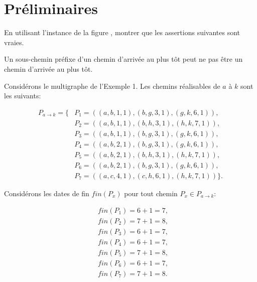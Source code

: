 
\section{Préliminaires}
\label{sec:preliminaires}

\begin{question}
  En utilisant l'instance de la figure , montrer que les assertions suivantes
  sont vraies.
\end{question}

\begin{assertion}
  Un sous-chemin préfixe d'un chemin d'arrivée au plus tôt peut ne pas
  être un chemin d'arrivée au plus tôt.
\end{assertion}


\begin{reponse}
  Considérons le multigraphe de l'Exemple 1. Les chemins réalisables de $a$ à
  $k$ sont les suivants:

  \begin{equation}
    \begin{align}
      \label{eq:1}
      P_{a \rightarrow k} = \{ & P_1 = ((a,b,1,1), (b,g,3,1), (g,k,6,1)), \\
                               & P_2 = ((a,b,1,1), (b,h,3,1), (h,k,7,1)), \\
                               & P_3 = ((a,b,1,1), (b,g,3,1), (g,k,6,1)), \\
                               & P_4 = ((a,b,2,1), (b,g,3,1), (g,k,6,1)), \\
                               & P_5 = ((a,b,2,1), (b,h,3,1), (h,k,7,1)), \\
                               & P_6 = ((a,b,2,1), (b,g,3,1), (g,k,6,1)), \\
                               & P_7 = ((a,c,4,1), (c,h,6,1), (h,k,7,1)) \}.
    \end{align}
  \end{equation}

  Considérons les dates de fin $fin(P_x)$ pour tout chemin
  $P_x \in P_{a \rightarrow k}$:

  \begin{equation}
    \begin{align}
      \label{eq:2}
      & fin(P_1) = 6 + 1 = 7, \\
      & fin(P_2) = 7 + 1 = 8, \\
      & fin(P_3) = 6 + 1 = 7, \\
      & fin(P_4) = 6 + 1 = 7, \\
      & fin(P_5) = 7 + 1 = 8, \\
      & fin(P_6) = 6 + 1 = 7, \\
      & fin(P_7) = 7 + 1 = 8.
    \end{align}
  \end{equation}


\end{reponse}
